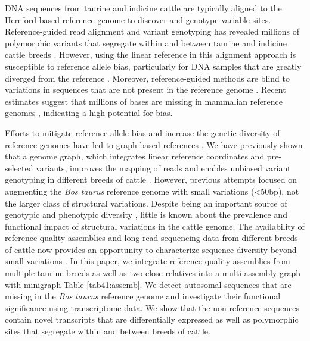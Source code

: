 \documentclass[../main.tex]{subfiles}
\begin{document}
DNA sequences from taurine and indicine cattle are typically aligned to the Hereford-based reference genome to discover and genotype variable sites. Reference-guided read alignment and variant genotyping has revealed millions of polymorphic variants that segregate within and between taurine and indicine cattle breeds \citep{kim2020mosaic,daetwyler2014whole,koufariotis2018sequencing}. However, using the linear reference in this alignment approach is susceptible to reference allele bias, particularly for DNA samples that are greatly diverged from the reference \citep{ballouz2019time,pritt2018forge}. Moreover, reference-guided methods are blind to variations in sequences that are not present in the reference genome \citep{wong2020towards}. Recent estimates suggest that millions of bases are missing in mammalian reference genomes \citep{sherman2019assembly,whitacre2015s}, indicating a high potential for bias.

Efforts to mitigate reference allele bias and increase the genetic diversity of reference genomes have led to graph-based references \citep{garrison2018variation,eggertsson2017graphtyper}. We have previously shown that a genome graph, which integrates linear reference coordinates and pre-selected variants, improves the mapping of reads and enables unbiased variant genotyping in different breeds of cattle \citep{crysnanto2019accurate,crysnanto2020bovine}. However, previous attempts focused on augmenting the \emph{Bos taurus} reference genome with small variations (<50bp), not the larger class of structural variations. Despite being an important source of genotypic and phenotypic diversity \citep{song2020eight,kehr2017diversity}, little is known about the prevalence and functional impact of structural variations in the cattle genome. The availability of reference-quality assemblies and long read sequencing data from different breeds of cattle now provides an opportunity to characterize sequence diversity beyond small variations \citep{hickey2020genotyping,li2020design}. 
In this paper, we integrate reference-quality assemblies from multiple taurine breeds as well as two close relatives into a multi-assembly graph with minigraph \citep{li2020design} Table \ref{tab41:assemb}. We detect autosomal sequences that are missing in the \emph{Bos taurus} reference genome and investigate their functional significance using transcriptome data. We show that the non-reference sequences contain novel transcripts that are differentially expressed as well as polymorphic sites that segregate within and between breeds of cattle.
\end{document}
